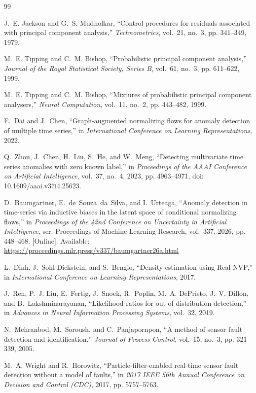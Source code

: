 \begin{thebibliography}{99}

J.~E. Jackson and G.~S. Mudholkar, ``Control procedures for residuals
associated with principal component analysis,'' \emph{Technometrics},
vol.~21, no.~3, pp. 341--349, 1979.

M.~E. Tipping and C.~M. Bishop, ``Probabilistic principal component
analysis,'' \emph{Journal of the Royal Statistical Society, Series B},
vol.~61, no.~3, pp. 611--622, 1999.

M.~E. Tipping and C.~M. Bishop, ``Mixtures of probabilistic principal
component analysers,'' \emph{Neural Computation}, vol.~11, no.~2,
pp. 443--482, 1999.

E.~Dai and J.~Chen, ``Graph-augmented normalizing flows for anomaly
detection of multiple time series,'' in \emph{International Conference
on Learning Representations}, 2022.

Q.~Zhou, J.~Chen, H.~Liu, S.~He, and W.~Meng, ``Detecting multivariate
time series anomalies with zero known label,'' in \emph{Proceedings
of the AAAI Conference on Artificial Intelligence}, vol.~37, no.~4,
2023, pp. 4963--4971, doi: 10.1609/aaai.v37i4.25623.

D.~Baumgartner, E.~de~Souza~da~Silva, and I.~Urteaga,
``Anomaly detection in time-series via inductive biases in the latent
space of conditional normalizing flows,'' in \emph{Proceedings of
the 42nd Conference on Uncertainty in Artificial Intelligence},
ser. Proceedings of Machine Learning Research, vol.~337, 2026,
pp. 448--468. [Online]. Available:
\url{https://proceedings.mlr.press/v337/baumgartner26a.html}

L.~Dinh, J.~Sohl-Dickstein, and S.~Bengio, ``Density estimation using
{Real NVP},'' in \emph{International Conference on Learning
Representations}, 2017.

J.~Ren, P.~J. Liu, E.~Fertig, J.~Snoek, R.~Poplin, M.~A. DePristo,
J.~V. Dillon, and B.~Lakshminarayanan, ``Likelihood ratios for
out-of-distribution detection,'' in \emph{Advances in Neural
Information Processing Systems}, vol.~32, 2019.

N.~Mehranbod, M.~Soroush, and C.~Panjapornpon, ``A method of sensor
fault detection and identification,'' \emph{Journal of Process
Control}, vol.~15, no.~3, pp. 321--339, 2005.

M.~A. Wright and R.~Horowitz, ``Particle-filter-enabled real-time
sensor fault detection without a model of faults,'' in \emph{2017
IEEE 56th Annual Conference on Decision and Control (CDC)}, 2017,
pp. 5757--5763.


\end{thebibliography}
